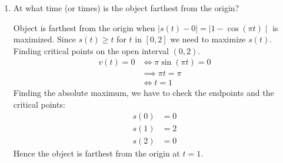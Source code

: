 \documentclass{ximera}
\begin{document}
\begin{problem}
\begin{enumerate}
	
	\begin{explanation}	
	Motion is in the positive direction when $v(t)>0$.
	
	\begin{align*}
	v(t)>0 & \iff \pi \sin(\pi t)>0\\
	& \iff \sin(\pi t)>0\\
	& \implies 0<\pi t <\pi\\
	& \iff 0<t<1	
	\end{align*}
	\end{explanation}

\item At what time (or times) is the object farthest from the origin?

	\begin{explanation}	
	Object is farthest from the origin when $\mid{s(t)-0}\mid=\mid{1-\cos(\pi t)}\mid$ is maximized.  Since $s(t) \ge t$ for $t$ in $[0,2]$ we need to maximize $s(t)$.
	Finding critical points on the open interval $(0,2)$.
	\begin{align*}
	v(t)=0 &\iff \pi\sin(\pi t)=0\\
	&\implies \pi t=\pi\\
	&\iff t=1
	\end{align*}
	Finding the absolute maximum, we have to check the endpoints and the critical points:
	\begin{align*}
	s(0)&=0\\
	s(1)&=2\\
	s(2)&=0
	\end{align*}
	Hence the object is farthest from the origin at $t=1$.
	
	\end{explanation}
\end{enumerate}
\end{problem}
\end{document}
